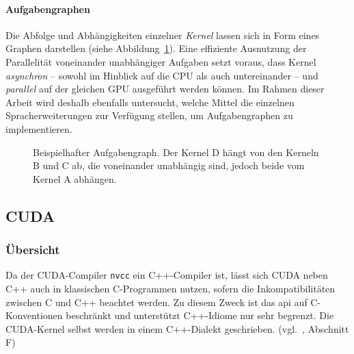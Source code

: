 \paragraph{Aufgabengraphen}

Die Abfolge und Abhängigkeiten einzelner \textit{Kernel} lassen sich in Form
eines Graphen darstellen (siehe
Abbildung~\ref{vergleich:anforderungen:aufgabensicht:graph}). Eine effiziente
Ausnutzung der Parallelität voneinander unabhängiger Aufgaben setzt voraus,
dass Kernel \textit{asynchron} -- sowohl im Hinblick auf die CPU als auch
untereinander -- und \textit{parallel} auf der gleichen GPU ausgeführt werden
können. Im Rahmen dieser Arbeit wird deshalb ebenfalls untersucht, welche Mittel
die einzelnen Spracherweiterungen zur Verfügung stellen, um Aufgabengraphen zu
implementieren.

\begin{figure}[htb]
    \centering
    \caption{Beispielhafter Aufgabengraph. Der Kernel D hängt von den Kerneln
             B und C ab, die voneinander unabhängig sind, jedoch beide vom
             Kernel A abhängen.}
    \label{vergleich:anforderungen:aufgabensicht:graph}
\end{figure}

\subsection{CUDA}
\label{vergleich:cuda}

\subsubsection{Übersicht}
\label{vergleich:cuda:uebersicht}

Da der CUDA-Compiler \texttt{nvcc} ein C++-Compiler ist, lässt sich CUDA neben
C++ auch in klassischen C-Programmen nutzen, sofern die Inkompatibilitäten
zwischen C und C++ beachtet werden. Zu diesem Zweck ist das \gls{api} auf
C-Konventionen beschränkt und unterstützt C++-Idiome nur sehr begrenzt. Die
CUDA-Kernel selbst werden in einem C++-Dialekt geschrieben.
(vgl.~\cite{cudaguide}, Abschnitt F)


